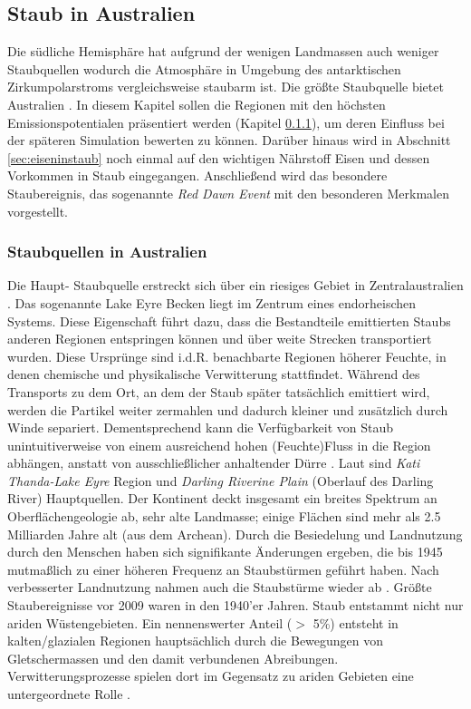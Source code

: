 \documentclass[12pt,a4paper,onecolumn]{scrartcl}
\begin{document}
\subsection{Staub in Australien} \label{sec:Staub}
Die südliche Hemisphäre hat aufgrund der wenigen Landmassen auch weniger Staubquellen wodurch die Atmosphäre in Umgebung des antarktischen Zirkumpolarstroms vergleichsweise staubarm ist. Die größte Staubquelle bietet Australien \citep{Shao.2011}. In diesem Kapitel sollen die Regionen mit den höchsten Emissionspotentialen präsentiert werden (Kapitel \ref{sec:staubquellen}), um deren Einfluss bei der späteren Simulation bewerten zu können. Darüber hinaus wird in Abschnitt \ref{sec:eiseninstaub} noch einmal auf den wichtigen Nährstoff Eisen und dessen Vorkommen in Staub eingegangen. Anschließend wird das besondere Staubereignis, das sogenannte \textit{Red Dawn Event} mit den besonderen Merkmalen vorgestellt.
\subsubsection{Staubquellen in Australien} \label{sec:staubquellen}
Die Haupt- Staubquelle erstreckt sich über ein riesiges Gebiet in Zentralaustralien \citep{Shao.2011}. Das sogenannte Lake Eyre Becken liegt im Zentrum eines endorheischen Systems. Diese Eigenschaft führt dazu, dass die Bestandteile emittierten Staubs anderen Regionen entspringen können und über weite Strecken transportiert wurden. Diese Ursprünge sind i.d.R. benachbarte Regionen höherer Feuchte, in denen chemische und physikalische Verwitterung stattfindet. Während des Transports zu dem Ort, an dem der Staub später tatsächlich emittiert wird, werden die Partikel weiter zermahlen und dadurch kleiner und zusätzlich durch Winde separiert. Dementsprechend kann die Verfügbarkeit von Staub unintuitiverweise von einem ausreichend hohen (Feuchte)Fluss in die Region abhängen, anstatt von ausschließlicher anhaltender Dürre \citep{Marx.2018}.
Laut \citet{Deckker.2019} sind \textit{Kati Thanda-Lake Eyre} Region und \textit{Darling Riverine Plain} (Oberlauf des Darling River) Hauptquellen. Der Kontinent deckt insgesamt ein breites Spektrum an Oberflächengeologie ab, sehr alte Landmasse; einige Flächen sind mehr als 2.5 Milliarden Jahre alt (aus dem Archean). Durch die Besiedelung und Landnutzung durch den Menschen haben sich signifikante Änderungen ergeben, die bis 1945 mutmaßlich zu einer höheren Frequenz an Staubstürmen geführt haben. Nach verbesserter Landnutzung nahmen auch die Staubstürme wieder ab \citep{Deckker.2019}. Größte Staubereignisse vor 2009 waren in den 1940'er Jahren. Staub entstammt nicht nur ariden Wüstengebieten. Ein nennenswerter Anteil ($>$ 5\%) entsteht in kalten/glazialen Regionen hauptsächlich durch die Bewegungen von Gletschermassen und den damit verbundenen Abreibungen. Verwitterungsprozesse spielen dort im Gegensatz zu ariden Gebieten eine untergeordnete Rolle \citep{Marx.2018}.
\end{document}

